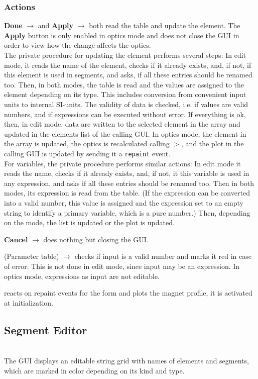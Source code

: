 \documentclass[12pt]{article}
\newcommand\code[1]{{\tt #1}}
\newcommand{\ofld}[1]{\colorbox{black!15}{{{\color{black}\bf #1}}}}
\newcommand{\ofldx}[1]{\colorbox{black!15}{{\color{black}(#1)}}}
\newcommand\guico[1]{{\color{blue}\code{#1}}}
\newcommand{\unico}[1]{{\color{burntorange}\code{#1}}}
\newcommand{\evcod}[2]{\ofld{#1} $\rightarrow$ \guico{#2}}
\newcommand{\evcodx}[2]{\ofldx{#1} $\rightarrow$ \guico{#2}}
\newcommand{\prcod}[2]{\opauni{#1}$>$\unico{#2}}
\newcommand{\opagui}[1]{\colorbox{blue!20}{{\color{black}\code{#1}}}}
\newcommand{\oguih}[2]{\subsection{\label{#2}#1}{\Huge\opagui{#2}}\\}
\newcommand{\ogui}[1]{\hyperref[#1]{\opagui{#1}}}
\newcommand{\opauni}[1]{\colorbox{orange!30}{{\color{black}\code{#1}}}}
\newcommand{\desc}[1]{#1}
\newcommand{\act}[1]{\subsubsection*{Actions} #1}
\begin{document}
\act{

\evcod{Done}{butOKClick} and \evcod{Apply}{butApplyClick} both read the table and update the element. The \ofld{Apply} button is only enabled in optics mode and does not close the GUI in order to view how the change affects the optics.\\ 
The private procedure \guico{SetElem} for updating the element performs several steps:
In edit mode, it reads the name of the element, checks if it already exists, and, if not, if this element is used in segments, and asks, if all these entries should be renamed too. Then, in both modes, the table is read and the values are assigned to the element depending on its type. This includes conversion from convenient input units to internal SI-units. The validity of data is checked, i.e. if values are valid numbers, and if expressions can be executed without error. If everything is ok, then, in edit mode, data are written to the selected element in the \unico{Elem} array and updated in the elements list of the calling \ogui{opamenu} GUI. In optics mode, the element in the \unico{Ella} array is updated, the optics is recalculated calling \prcod{linoplib}{OpticReCalc}, and the plot in the calling \ogui{opalinop} GUI is updated by sending it a \code{repaint} event.\\
For variables, the private procedure \guico{SetVar} performs similar actions: In edit mode it reads the name, checks if it already exists, and, if not, it this variable is used in any expression, and asks if all these entries should be renamed too. Then in both modes, its expression is read from the table. (If the expression can be converted into a valid number, this value is assigned and the expression set to an empty string to identify a primary variable, which is a pure number.) Then, depending on the mode, the \ogui{opamenu} list is updated or the \ogui{opalinop} plot is updated.

\evcod{Cancel}{butCancelClick} does nothing but closing the GUI.

\evcodx{Parameter table}{TabDrawCell} checks if input is a valid number and marks it red in case of error. This is not done in edit mode, since input may be an expression. In optics mode, expressions as input are not editable.

\guico{ppaint} reacts on repaint events for the form and plots the magnet profile, it is activated at initialization.
}


\oguih{Segment Editor}{osegedit}

\desc{
The GUI displays an editable string grid with names of elements and segments, which are marked in color depending on its kind and type. 
}
\end{document}
